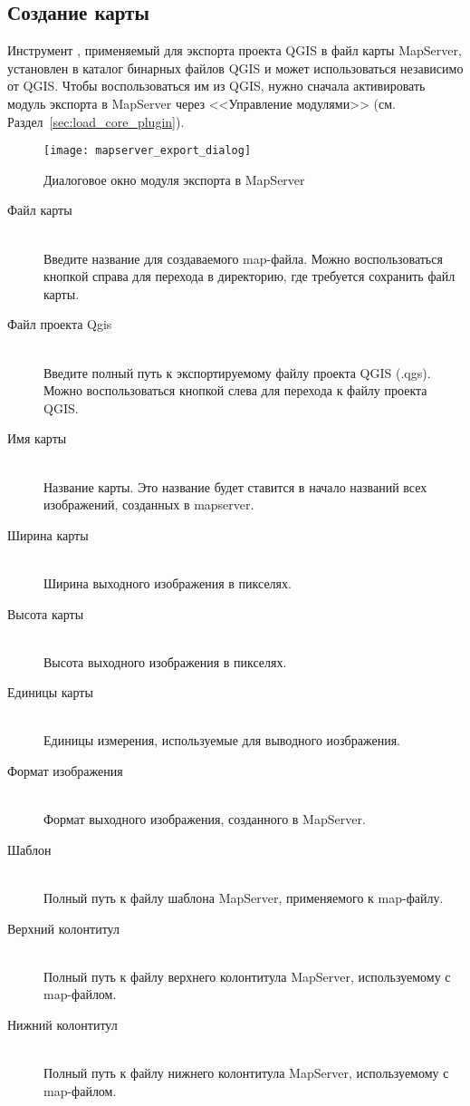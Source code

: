 \subsection{Создание карты}

Инструмент , применяемый для экспорта проекта QGIS
в файл карты MapServer, установлен в каталог бинарных файлов QGIS и
может использоваться независимо от QGIS. Чтобы воспользоваться им из
QGIS, нужно сначала активировать модуль экспорта в MapServer через
<<Управление модулями>> (см. Раздел~\ref{sec:load_core_plugin}).

\begin{figure}[ht]
\centering
  \texttt{[image: mapserver\_export\_dialog]}
  \caption{Диалоговое окно модуля экспорта в MapServer \nixcaption}
  \label{fig:mapserver_export_dialog}
\end{figure}

\begin{description}
\item [Файл карты] \mbox{}\\
Введите название для создаваемого map-файла. Можно воспользоваться
кнопкой справа для перехода в директорию, где требуется сохранить файл
карты.
\item [Файл проекта Qgis] \mbox{}\\
Введите полный путь к экспортируемому файлу проекта QGIS (.qgs). Можно
воспользоваться кнопкой слева для перехода к файлу проекта QGIS.
\item [Имя карты] \mbox{}\\
Название карты. Это название будет ставится в начало названий всех
изображений, созданных в mapserver.
\item [Ширина карты] \mbox{}\\
Ширина выходного изображения в пикселях.
\item [Высота карты] \mbox{}\\
Высота выходного изображения в пикселях.
\item [Единицы карты] \mbox{}\\
Единицы измерения, используемые для выводного иозбражения.
\item [Формат изображения] \mbox{}\\
Формат выходного изображения, созданного в MapServer.
\item [Шаблон] \mbox{}\\
Полный путь к файлу шаблона MapServer, применяемого к map-файлу.
\item [Верхний колонтитул] \mbox{}\\
Полный путь к файлу верхнего колонтитула MapServer, используемому с
map-файлом.
\item [Нижний колонтитул] \mbox{}\\
Полный путь к файлу нижнего колонтитула MapServer, используемому с
map-файлом.
\end{description}

